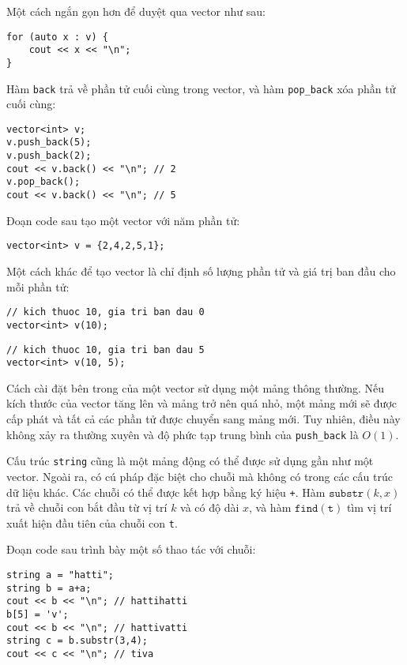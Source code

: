 \begin{samepage}
Một cách ngắn gọn hơn để duyệt qua vector như sau:

\begin{lstlisting}
for (auto x : v) {
    cout << x << "\n";
}
\end{lstlisting}
\end{samepage}

Hàm \texttt{back} trả về phần tử cuối cùng
trong vector, và
hàm \texttt{pop\_back} xóa phần tử cuối cùng:

\begin{lstlisting}
vector<int> v;
v.push_back(5);
v.push_back(2);
cout << v.back() << "\n"; // 2
v.pop_back();
cout << v.back() << "\n"; // 5
\end{lstlisting}

Đoạn code sau tạo một vector với năm phần tử:

\begin{lstlisting}
vector<int> v = {2,4,2,5,1};
\end{lstlisting}

Một cách khác để tạo vector là chỉ định số lượng
phần tử và giá trị ban đầu cho mỗi phần tử:

\begin{lstlisting}
// kich thuoc 10, gia tri ban dau 0
vector<int> v(10);
\end{lstlisting}
\begin{lstlisting}
// kich thuoc 10, gia tri ban dau 5
vector<int> v(10, 5);
\end{lstlisting}

Cách cài đặt bên trong của một vector
sử dụng một mảng thông thường.
Nếu kích thước của vector tăng lên và
mảng trở nên quá nhỏ,
một mảng mới sẽ được cấp phát và tất cả các
phần tử được chuyển sang mảng mới.
Tuy nhiên, điều này không xảy ra thường xuyên và
độ phức tạp trung bình của
\texttt{push\_back} là $O(1)$.


Cấu trúc \texttt{string}
cũng là một mảng động có thể được sử dụng gần như một vector.
Ngoài ra, có cú pháp đặc biệt cho chuỗi
mà không có trong các cấu trúc dữ liệu khác.
Các chuỗi có thể được kết hợp bằng ký hiệu \texttt{+}.
Hàm $\texttt{substr}(k,x)$ trả về chuỗi con
bắt đầu từ vị trí $k$ và có độ dài $x$,
và hàm $\texttt{find}(\texttt{t})$ tìm vị trí
xuất hiện đầu tiên của chuỗi con \texttt{t}.

Đoạn code sau trình bày một số thao tác với chuỗi:

\begin{lstlisting}
string a = "hatti";
string b = a+a;
cout << b << "\n"; // hattihatti
b[5] = 'v';
cout << b << "\n"; // hattivatti
string c = b.substr(3,4);
cout << c << "\n"; // tiva
\end{lstlisting}

